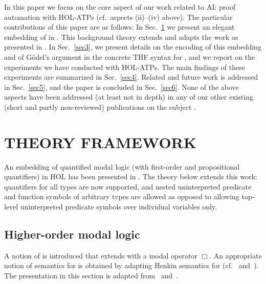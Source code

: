 \documentclass{ecai2014}
\newcommand\entity[1]{\text{\textrm{#1}}}
\def\HOML{\entity{HOML}\xspace}
\def\HOL{\entity{HOL}\xspace}
\begin{document}
In this paper we focus on the core aspect of our work related to AI: proof automation with HOL-ATPs (cf.~aspects (ii)--(iv)
above). %
The particular contributions of this paper are as follows: 
In Sec.~\ref{sec2} we present an elegant embedding of 
\HOML \cite{Gallin75,homl} in \HOL \cite{andrewsSEP,B5}. 
This background theory extends and
adapts the work as presented in \cite{J23,B9}.
In Sec.~\ref{sec3}, we present details on the
encoding of this embedding and of G{\"o}del's argument in the
concrete THF syntax \cite{J22} for \HOL, and we report on the
experiments we have conducted with HOL-ATPs.  The main findings of
these experiments are summarized in Sec.~\ref{sec4}.
Related and future work is addressed in Sec.~\ref{sec5}, and the paper
is concluded in Sec.~\ref{sec6}.
None of the above aspects have been addressed (at least
not in depth) in any of our other existing (short and partly
non-reviewed) publications on the subject \cite{J30,J29,W50,J28}.



\section{THEORY FRAMEWORK}\label{sec2}
An embedding of quantified modal logic (with first-order and
propositional quantifiers) in HOL has been presented in
\cite{J23}. The theory below extends this work: quantifiers for all
types are now supported, and nested uninterpreted predicate and
function symbols of arbitrary types
are allowed as opposed to allowing top-level uninterpreted
predicate symbols over individual variables only.

\subsection{Higher-order modal logic}
A notion of \HOML is introduced that extends \HOL with a modal
operator $\Box$. An appropriate notion of semantics for \HOML is
obtained by adapting Henkin semantics for \HOL (cf.~\cite{Henkin50}
and~\cite{Gallin75}). The presentation in this section is adapted
from~\cite{homl} and~\cite{andrewsSEP}.
\end{document}
